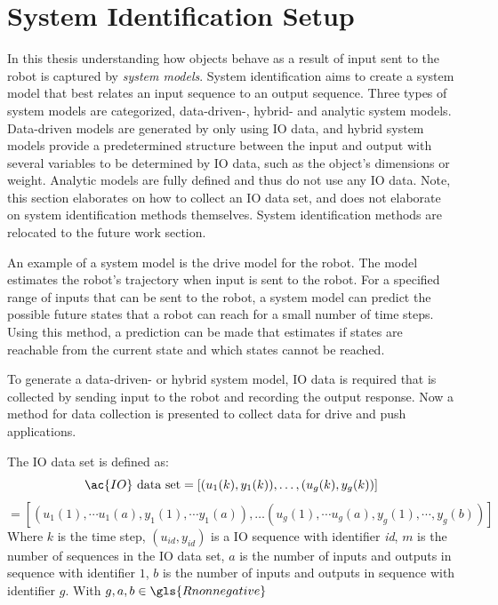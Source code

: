 \section{System Identification Setup}%
\label{sec:sys_iden}
In this thesis understanding how objects behave as a result of input sent to the robot is captured by \textit{system models}. System identification aims to create a system model that best relates an input sequence to an output sequence. Three types of system models are categorized, data-driven-, hybrid- and analytic system models. Data-driven models are generated by only using \ac{IO} data, and hybrid system models provide a predetermined structure between the input and output with several variables to be determined by \ac{IO} data, such as the object's dimensions or weight. Analytic models are fully defined and thus do not use any \ac{IO} data. Note, this section elaborates on how to collect an \ac{IO} data set, and does not elaborate on system identification methods themselves. System identification methods are relocated to the future work section.\bs

An example of a system model is the drive model for the robot. The model estimates the robot's trajectory when input is sent to the robot. For a specified range of inputs that can be sent to the robot, a system model can predict the possible future states that a robot can reach for a small number of time steps. Using this method, a prediction can be made that estimates if states are reachable from the current state and which states cannot be reached.\bs

To generate a data-driven- or hybrid system model, \ac{IO} data is required that is collected by sending input to the robot and recording the output response. Now a method for data collection is presented to collect data for drive and push applications.\bs

The \ac{IO} data set is defined as:
\[ \ac{IO} \textrm{ data set} = \left[(u_1(k), y_1(k)), \dots, (u_g(k), y_g(k)) \right]\]
\[= \left[(u_1(1), \cdots u_1(a), y_1(1), \cdots y_1(a)), \dots (u_g(1), \cdots u_g(a), y_g(1), \cdots, y_g(b)) \right]\]
Where $k$ is the time step, $(u_\mathit{id}, y_\mathit{id})$ is a \ac{IO} sequence with identifier \textit{id}, $m$ is the number of sequences in the \ac{IO} data set, $a$ is the number of inputs and outputs in sequence with identifier $1$, $b$ is the number of inputs and outputs in sequence with identifier $g$. With $g, a, b \in \gls{Rnonnegative}$\bs

